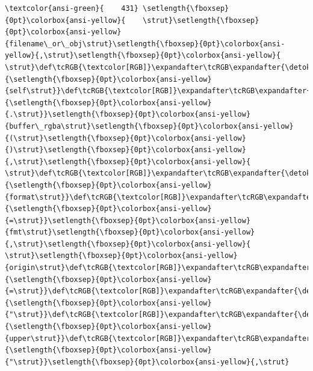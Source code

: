 \documentclass[11pt]{article}
\begin{document}
\begin{Verbatim}[commandchars=\\\{\}, frame=single, framerule=2mm, rulecolor=\color{outerrorbackground}]
\textcolor{ansi-green}{    431} \setlength{\fboxsep}{0pt}\colorbox{ansi-yellow}{    \strut}\setlength{\fboxsep}{0pt}\colorbox{ansi-yellow}{filename\_or\_obj\strut}\setlength{\fboxsep}{0pt}\colorbox{ansi-yellow}{,\strut}\setlength{\fboxsep}{0pt}\colorbox{ansi-yellow}{ \strut}\def\tcRGB{\textcolor[RGB]}\expandafter\tcRGB\expandafter{\detokenize{0,135,0}}{\setlength{\fboxsep}{0pt}\colorbox{ansi-yellow}{self\strut}}\def\tcRGB{\textcolor[RGB]}\expandafter\tcRGB\expandafter{\detokenize{98,98,98}}{\setlength{\fboxsep}{0pt}\colorbox{ansi-yellow}{.\strut}}\setlength{\fboxsep}{0pt}\colorbox{ansi-yellow}{buffer\_rgba\strut}\setlength{\fboxsep}{0pt}\colorbox{ansi-yellow}{(\strut}\setlength{\fboxsep}{0pt}\colorbox{ansi-yellow}{)\strut}\setlength{\fboxsep}{0pt}\colorbox{ansi-yellow}{,\strut}\setlength{\fboxsep}{0pt}\colorbox{ansi-yellow}{ \strut}\def\tcRGB{\textcolor[RGB]}\expandafter\tcRGB\expandafter{\detokenize{0,135,0}}{\setlength{\fboxsep}{0pt}\colorbox{ansi-yellow}{format\strut}}\def\tcRGB{\textcolor[RGB]}\expandafter\tcRGB\expandafter{\detokenize{98,98,98}}{\setlength{\fboxsep}{0pt}\colorbox{ansi-yellow}{=\strut}}\setlength{\fboxsep}{0pt}\colorbox{ansi-yellow}{fmt\strut}\setlength{\fboxsep}{0pt}\colorbox{ansi-yellow}{,\strut}\setlength{\fboxsep}{0pt}\colorbox{ansi-yellow}{ \strut}\setlength{\fboxsep}{0pt}\colorbox{ansi-yellow}{origin\strut}\def\tcRGB{\textcolor[RGB]}\expandafter\tcRGB\expandafter{\detokenize{98,98,98}}{\setlength{\fboxsep}{0pt}\colorbox{ansi-yellow}{=\strut}}\def\tcRGB{\textcolor[RGB]}\expandafter\tcRGB\expandafter{\detokenize{175,0,0}}{\setlength{\fboxsep}{0pt}\colorbox{ansi-yellow}{"\strut}}\def\tcRGB{\textcolor[RGB]}\expandafter\tcRGB\expandafter{\detokenize{175,0,0}}{\setlength{\fboxsep}{0pt}\colorbox{ansi-yellow}{upper\strut}}\def\tcRGB{\textcolor[RGB]}\expandafter\tcRGB\expandafter{\detokenize{175,0,0}}{\setlength{\fboxsep}{0pt}\colorbox{ansi-yellow}{"\strut}}\setlength{\fboxsep}{0pt}\colorbox{ansi-yellow}{,\strut}

\end{Verbatim}
\end{document}

